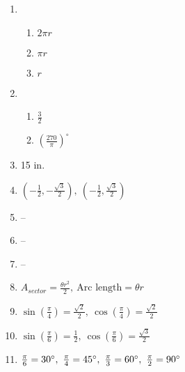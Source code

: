 \documentclass{article}
\begin{document}
\begin{enumerate}
\item

	\begin{enumerate}
	
	\item $2 \pi r$
	
	\item $\pi r$
	
	\item $r$
	
	\end{enumerate}
	
\item

	\begin{enumerate}
	
	\item $\frac{3}{2}$
	
	\item $\left( \frac{270}{\pi} \right)^ \circ$
	
	\end{enumerate}
	
\item 15 in.

\item $\left( -\frac{1}{2}, -\frac{\sqrt{3}}{2} \right), \ \left( -\frac{1}{2}, \frac{\sqrt{3}}{2} \right)$

\item --

\item --

\item --

\item $A_{sector} = \frac{\theta r^2}{2}, \ \text{Arc length} = \theta r$

\item $\sin \left( \frac{\pi}{4} \right) = \frac{\sqrt{2}}{2}, \ \cos \left( \frac{\pi}{4} \right)  = \frac{\sqrt{2}}{2}$

\item $\sin \left( \frac{\pi}{6} \right) = \frac{1}{2}, \ \cos \left( \frac{\pi}{6} \right) = \frac{\sqrt{3}}{2}$

\item $\frac{\pi}{6} = 30 \degree, \ \frac{\pi}{4} = 45 \degree,  \ \frac{\pi}{3} = 60 \degree, \ \frac{\pi}{2} = 90 \degree$

\end{enumerate}
\end{document}
